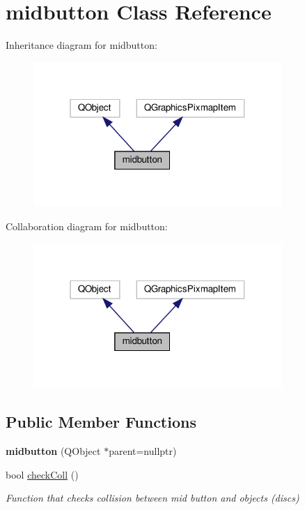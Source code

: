\hypertarget{classmidbutton}{}\section{midbutton Class Reference}
\label{classmidbutton}


Inheritance diagram for midbutton\+:\nopagebreak
\begin{figure}[H]
\begin{center}
\leavevmode
\includegraphics[width=268pt]{classmidbutton__inherit__graph}
\end{center}
\end{figure}


Collaboration diagram for midbutton\+:\nopagebreak
\begin{figure}[H]
\begin{center}
\leavevmode
\includegraphics[width=268pt]{classmidbutton__coll__graph}
\end{center}
\end{figure}
\subsection*{Public Member Functions}
\begin{DoxyCompactItemize}
\item 
\mbox{\label{classmidbutton_a18399a4d013722bf7df021ef68f0df7c}} 
{\bfseries midbutton} (Q\+Object $\ast$parent=nullptr)
\item 
bool \hyperlink{classmidbutton_a6a711973ae7e7d0a3d98f0581130521d}{check\+Coll} ()
\begin{DoxyCompactList}\small\item\em Function that checks collision between mid button and objects (discs) \end{DoxyCompactList}\end{DoxyCompactItemize}


